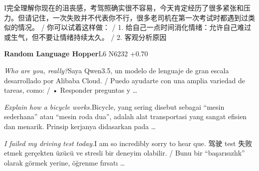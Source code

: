 \begin{multicols}{2}
I完\allowbreak{}全\allowbreak{}理\allowbreak{}解\allowbreak{}你\allowbreak{}现\allowbreak{}在\allowbreak{}的\allowbreak{}沮\allowbreak{}\allowbreak{}丧\allowbreak{}感\allowbreak{}，\allowbreak{}考\allowbreak{}驾\allowbreak{}照\allowbreak{}确\allowbreak{}实\allowbreak{}很\allowbreak{}不\allowbreak{}\allowbreak{}容\allowbreak{}易\allowbreak{}，\allowbreak{}今\allowbreak{}天\allowbreak{}肯\allowbreak{}定\allowbreak{}经\allowbreak{}历\allowbreak{}了\allowbreak{}\allowbreak{}很\allowbreak{}多\allowbreak{}紧\allowbreak{}张\allowbreak{}和\allowbreak{}压\allowbreak{}力\allowbreak{}。\allowbreak{}但\allowbreak{}请\allowbreak{}\allowbreak{}记\allowbreak{}住\allowbreak{}，\allowbreak{}一\allowbreak{}次\allowbreak{}失\allowbreak{}败\allowbreak{}并\allowbreak{}不\allowbreak{}代\allowbreak{}\allowbreak{}表\allowbreak{}你\allowbreak{}不\allowbreak{}行\allowbreak{}，\allowbreak{}很\allowbreak{}多\allowbreak{}老\allowbreak{}司\allowbreak{}机\allowbreak{}\allowbreak{}在\allowbreak{}第\allowbreak{}一\allowbreak{}次\allowbreak{}考\allowbreak{}试\allowbreak{}时\allowbreak{}都\allowbreak{}遇\allowbreak{}到\allowbreak{}\allowbreak{}过\allowbreak{}类\allowbreak{}似\allowbreak{}的\allowbreak{}情\allowbreak{}况\allowbreak{}。\allowbreak{} / 你\allowbreak{}可\allowbreak{}以\allowbreak{}试\allowbreak{}着\allowbreak{}这\allowbreak{}样\allowbreak{}做\allowbreak{}：\allowbreak{} / 1. 给\allowbreak{}自\allowbreak{}己\allowbreak{}一\allowbreak{}点\allowbreak{}时\allowbreak{}间\allowbreak{}消\allowbreak{}化\allowbreak{}情\allowbreak{}\allowbreak{}绪\allowbreak{}：\allowbreak{}允\allowbreak{}许\allowbreak{}自\allowbreak{}己\allowbreak{}难\allowbreak{}过\allowbreak{}或\allowbreak{}生\allowbreak{}\allowbreak{}气\allowbreak{}，\allowbreak{}但\allowbreak{}不\allowbreak{}要\allowbreak{}让\allowbreak{}情\allowbreak{}绪\allowbreak{}持\allowbreak{}续\allowbreak{}\allowbreak{}太\allowbreak{}久\allowbreak{}。\allowbreak{} / 2. 客\allowbreak{}观\allowbreak{}分\allowbreak{}析\allowbreak{}原\allowbreak{}因\allowbreak{}\par\medskip
{}\noindent\textbf{Random Language Hopper}\hfill{\ttfamily L6 N6232 +0.70}\par\noindent\textit{Who are you, really?}\enspace Saya Qwen3.5, un modelo de lenguaje de gran escala desarrollado por Alibaba Cloud. / Puedo ayudarte con una amplia variedad de tareas, como: / • Responder preguntas y …\par\noindent\textit{Explain how a bicycle works.}\enspace Bicycle, yang sering disebut sebagai “mesin sederhana” atau “mesin roda dua”, adalah alat transportasi yang sangat efisien dan menarik. Prinsip kerjanya didasarkan pada …\par\noindent\textit{I failed my driving test today.}\enspace I am so incredibly sorry to hear que. 驾\allowbreak{}驶\allowbreak{} test 失\allowbreak{}败\allowbreak{} etmek gerçekten üzücü ve stresli bir deneyim olabilir. / Bunu bir “başarısızlık” olarak görmek yerine, öğrenme fırsatı …\par\medskip

\end{multicols}
